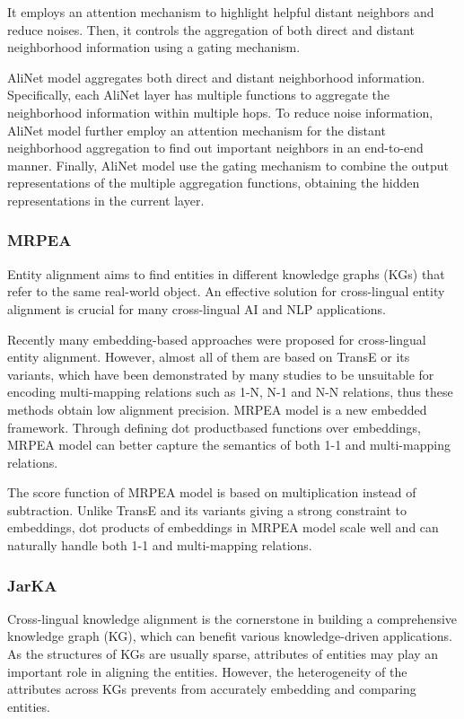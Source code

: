 \documentclass[sigconf]{acmart}
\begin{document}
{It employs an attention mechanism to highlight helpful distant neighbors and reduce noises. Then, it controls the aggregation of both direct and distant neighborhood information using a gating mechanism. 

AliNet model aggregates both direct and distant neighborhood information. Specifically, each AliNet layer has multiple functions to aggregate the neighborhood information within multiple hops. To reduce noise information, AliNet model further employ an attention mechanism for the distant neighborhood aggregation to find out important neighbors in an end-to-end manner. Finally, AliNet model use the gating mechanism to combine the output representations of the multiple aggregation functions, obtaining the hidden representations in the current layer. 

\subsubsection{MRPEA \cite{shi2019modeling}}

Entity alignment aims to find entities in different knowledge graphs (KGs) that refer to the same real-world object. An effective solution for cross-lingual entity alignment is crucial for many cross-lingual AI and NLP applications.

Recently many embedding-based approaches were proposed for cross-lingual entity alignment. However, almost all of them are based on TransE or its variants, which have been demonstrated by many studies to be unsuitable for encoding multi-mapping relations such as 1-N, N-1 and N-N relations, thus these methods obtain low alignment precision. MRPEA model is a new embedded framework. Through defining dot productbased functions over embeddings, MRPEA model can better capture the semantics of both 1-1 and multi-mapping relations. 

The score function of MRPEA model is based on multiplication instead of subtraction. Unlike TransE and its variants giving a strong constraint to embeddings, dot products of embeddings in MRPEA model scale well and can naturally handle both 1-1 and multi-mapping relations. 

\subsubsection{JarKA \cite{chen2020jarka}}

Cross-lingual knowledge alignment is the cornerstone in building a comprehensive knowledge graph (KG), which can benefit various knowledge-driven applications. As the structures of KGs are usually sparse, attributes of entities may play an important role in aligning the entities. However, the heterogeneity of the attributes across KGs prevents from accurately embedding and comparing entities. 

}
\end{document}
